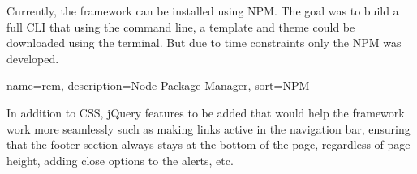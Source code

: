 Currently, the framework can be installed using \gls{NPM}. The goal was to build a full \gls{CLI} that using the command line, a template and theme could be downloaded using the terminal. But due to time constraints only the \gls{NPM} was developed. 


{
  name={rem},
  description={Node Package Manager},
  sort=NPM
}

In addition to \gls{CSS}, jQuery features to be added that would help the framework work more seamlessly such as making links active in the navigation bar, ensuring that the footer section always stays at the bottom of the page, regardless of page height, adding close options to the alerts, etc. 

%
%

